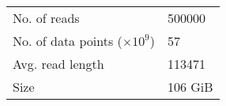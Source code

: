 	\begin{tabular}{|l|m{4cm}|}
        \hline
	No. of reads & \num{500000}\\
	No. of data points ($\times 10^9$) & 57\\
	Avg. read length & \num{113471}\\
    Size & 106 GiB\\
	\hline
    \end{tabular}

